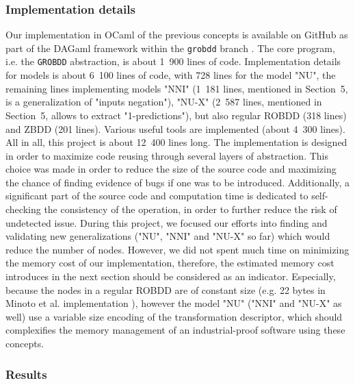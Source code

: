 \documentclass[a4paper,10pt]{article}
\newcommand{\GroBdd}{\texttt{GROBDD}}
\begin{document}
\subsubsection{Implementation details}
Our implementation in OCaml of the previous concepts is available on GitHub as part of the DAGaml framework within the \texttt{grobdd} branch \cite{DAGamlGitHub}.
The core program, i.e. the \GroBdd{} abstraction, is about 1~900 lines of code.
Implementation details for models is about 6~100 lines of code, with 728 lines for the model "NU", the remaining lines implementing models "NNI" (1~181 lines, mentioned in Section~5, is a generalization of "inputs negation"), "NU-X" (2~587 lines, mentioned in Section~5, allows to extract "1-predictions"), but also regular ROBDD (318 lines) and ZBDD (201 lines).
Various useful tools are implemented (about 4~300 lines).
All in all, this project is about 12~400 lines long.
The implementation is designed in order to maximize code reusing through several layers of abstraction.
This choice was made in order to reduce the size of the source code and maximizing the chance of finding evidence of bugs if one was to be introduced.
Additionally, a significant part of the source code and computation time is dedicated to self-checking the consistency of the operation, in order to further reduce the risk of undetected issue.
During this project, we focused our efforts into finding and validating new generalizations ("NU", "NNI" and "NU-X" so far) which would reduce the number of nodes.
However, we did not spent much time on minimizing the memory cost of our implementation, therefore, the estimated memory cost introduces in the next section should be considered as an indicator.
Especially, because the nodes in a regular ROBDD are of constant size (e.g. 22 bytes in Minoto et al. implementation \cite{MinatoVariants}), however the model "NU" ("NNI" and "NU-X" as well) use a variable size encoding of the transformation descriptor, which should complexifies the memory management of an industrial-proof software using these concepts.

\subsubsection{Results}
\end{document}
